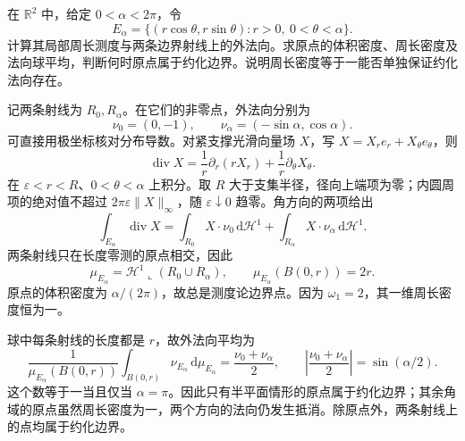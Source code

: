 \begin{exercise}\label{g3:ex:sector-reduced-vertex}
	在 \(\mathbb R^2\) 中，给定 \(0<\alpha<2\pi\)，令
	\[
		E_\alpha=\{(r\cos\theta,r\sin\theta):r>0,\ 0<\theta<\alpha\}.
	\]
	计算其局部周长测度与两条边界射线上的外法向。求原点的体积密度、周长密度及法向球平均，判断何时原点属于约化边界。说明周长密度等于一能否单独保证约化法向存在。
\end{exercise}
\begin{solution}
	记两条射线为 \(R_0,R_\alpha\)。在它们的非零点，外法向分别为
	\[
		\nu_0=(0,-1),\qquad \nu_\alpha=(-\sin\alpha,\cos\alpha).
	\]
	可直接用极坐标核对分布导数。对紧支撑光滑向量场 \(X\)，写
	\(X=X_r e_r+X_\theta e_\theta\)，则
	\[
		\operatorname{div}X
		=\frac1r\partial_r(rX_r)+\frac1r\partial_\theta X_\theta.
	\]
	在 \(\varepsilon<r<R\)、\(0<\theta<\alpha\) 上积分。取 \(R\) 大于支集半径，径向上端项为零；内圆周项的绝对值不超过 \(2\pi\varepsilon\|X\|_\infty\)，随 \(\varepsilon\downarrow0\) 趋零。角方向的两项给出
	\[
		\int_{E_\alpha}\operatorname{div}X
		=\int_{R_0}X\cdot\nu_0\,\mathrm d\mathcal H^1
		+\int_{R_\alpha}X\cdot\nu_\alpha\,\mathrm d\mathcal H^1.
	\]
	两条射线只在长度零测的原点相交，因此
	\[
		\mu_{E_\alpha}=\mathcal H^1\llcorner(R_0\cup R_\alpha),
		\qquad
		\mu_{E_\alpha}(B(0,r))=2r.
	\]
	原点的体积密度为 \(\alpha/(2\pi)\)，故总是测度论边界点。因为 \(\omega_1=2\)，其一维周长密度恒为一。

	球中每条射线的长度都是 \(r\)，故外法向平均为
	\[
		\frac1{\mu_{E_\alpha}(B(0,r))}
		\int_{B(0,r)}\nu_{E_\alpha}\,\mathrm d\mu_{E_\alpha}
		=\frac{\nu_0+\nu_\alpha}{2},
		\qquad
		\left|\frac{\nu_0+\nu_\alpha}{2}\right|
		=\sin(\alpha/2).
	\]
	这个数等于一当且仅当 \(\alpha=\pi\)。因此只有半平面情形的原点属于约化边界；其余角域的原点虽然周长密度为一，两个方向的法向仍发生抵消。除原点外，两条射线上的点均属于约化边界。
\end{solution}

